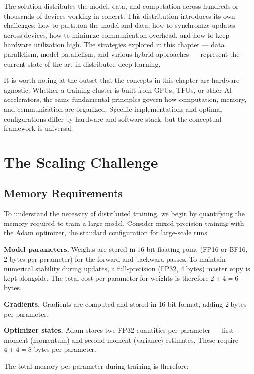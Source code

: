\documentclass{book}
\begin{document}
The solution distributes the model, data, and computation across hundreds or
thousands of devices working in concert. This distribution introduces its own
challenges: how to partition the model and data, how to synchronize updates
across devices, how to minimize communication overhead, and how to keep
hardware utilization high. The strategies explored in this chapter --- data
parallelism, model parallelism, and various hybrid approaches --- represent
the current state of the art in distributed deep learning.

It is worth noting at the outset that the concepts in this chapter are
hardware-agnostic. Whether a training cluster is built from GPUs, TPUs, or
other AI accelerators, the same fundamental principles govern how computation,
memory, and communication are organized. Specific implementations and optimal
configurations differ by hardware and software stack, but the conceptual
framework is universal.

\section{The Scaling Challenge}
\label{sec:scaling_challenge}

\subsection{Memory Requirements}
\label{sec:memory_requirements}

To understand the necessity of distributed training, we begin by quantifying
the memory required to train a large model. Consider mixed-precision training
with the Adam optimizer, the standard configuration for large-scale runs.

\textbf{Model parameters.} Weights are stored in 16-bit floating point (FP16
or BF16, 2 bytes per parameter) for the forward and backward passes.
To maintain numerical stability during updates, a full-precision (FP32,
4 bytes) master copy is kept alongside. The total cost per parameter for
weights is therefore $2 + 4 = 6$ bytes.

\textbf{Gradients.} Gradients are computed and stored in 16-bit format,
adding $2$ bytes per parameter.

\textbf{Optimizer states.} Adam stores two FP32 quantities per parameter ---
first-moment (momentum) and second-moment (variance) estimates. These require
$4 + 4 = 8$ bytes per parameter.

The total memory per parameter during training is therefore:
\end{document}
